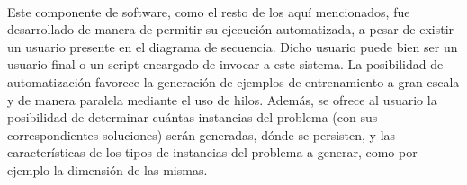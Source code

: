 \paragraph{} Este componente de software, como el resto de los aquí mencionados, fue desarrollado de manera de permitir su ejecución automatizada, a pesar de existir un usuario presente en el diagrama de secuencia. Dicho usuario puede bien ser un usuario final o un script encargado de invocar a este sistema. La posibilidad de automatización favorece la generación de ejemplos de entrenamiento a gran escala y de manera paralela mediante el uso de hilos. Además, se ofrece al usuario la posibilidad de determinar cuántas instancias del problema (con sus correspondientes soluciones) serán generadas, dónde se persisten, y las características de los tipos de instancias del problema a generar, como por ejemplo la dimensión de las mismas.